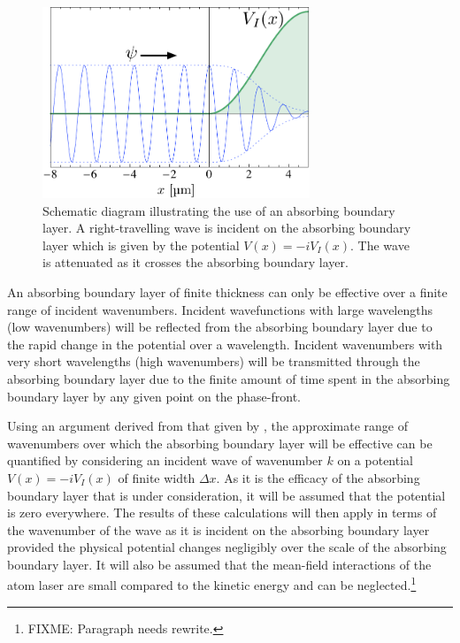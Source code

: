 \begin{figure}
    \centering
    \includegraphics[width=8cm]{AbsorbingBoundarySchematic}
    \caption{
        \label{BackgroundTheory:AbsorbingBoundarySchematic}
        Schematic diagram illustrating the use of an absorbing boundary layer. A right-travelling wave is incident on the absorbing boundary layer which is given by the potential $V(x) = -i V_I(x)$. The wave is attenuated as it crosses the absorbing boundary layer.
    }
\end{figure}

An absorbing boundary layer of finite thickness can only be effective over a finite range of incident wavenumbers. Incident wavefunctions with large wavelengths (low wavenumbers) will be reflected from the absorbing boundary layer due to the rapid change in the potential over a wavelength. Incident wavenumbers with very short wavelengths (high wavenumbers) will be transmitted through the absorbing boundary layer due to the finite amount of time spent in the absorbing boundary layer by any given point on the phase-front. 

Using an argument derived from that given by \citet{Neuhasuer:1989}, the approximate range of wavenumbers over which the absorbing boundary layer will be effective can be quantified by considering an incident wave of wavenumber $k$ on a potential $V(x) = -i V_I(x)$ of finite width $\Delta x$. As it is the efficacy of the absorbing boundary layer that is under consideration, it will be assumed that the potential is zero everywhere. The results of these calculations will then apply in terms of the wavenumber of the wave as it is incident on the absorbing boundary layer provided the physical potential changes negligibly over the scale of the absorbing boundary layer. It will also be assumed that the mean-field interactions of the atom laser are small compared to the kinetic energy and can be neglected.\footnote{FIXME: Paragraph needs rewrite.}

